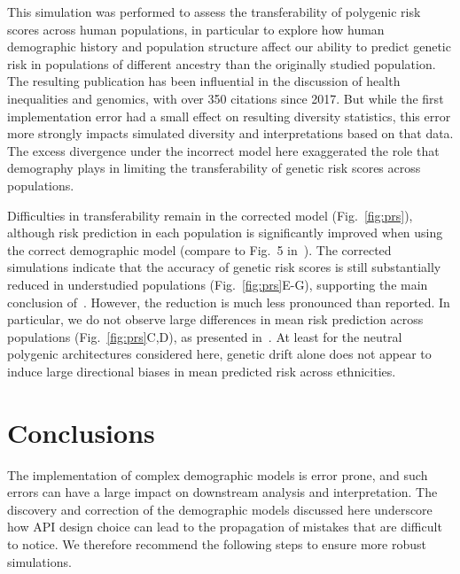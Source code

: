 \documentclass{article}
\begin{document}
This simulation was performed to assess the
transferability of polygenic risk scores across human populations, in particular to
explore how human demographic history and population structure affect our ability
to predict genetic risk in populations of different ancestry than the originally studied
population.
The resulting publication has been influential in the discussion of
health inequalities and genomics, with over 350 citations since 2017.
But while the first implementation error had a small effect on resulting diversity statistics,
this error more strongly impacts simulated diversity and interpretations based on that data.
The excess divergence under the incorrect model here exaggerated the role that demography
plays in limiting the transferability of genetic risk scores across populations.

Difficulties in transferability remain in the corrected model (Fig.~\ref{fig:prs}), although
risk prediction in each population is significantly improved when using the correct
demographic model (compare to Fig.~5 in~\citet{martin2017human}).
The corrected simulations indicate that the accuracy of genetic risk scores is still
substantially reduced in understudied populations (Fig.~\ref{fig:prs}E-G),
supporting the main conclusion of~\citet{martin2017human}.
However, the reduction is much less pronounced than reported.
In particular, we do not observe large differences in mean risk prediction
across populations (Fig.~\ref{fig:prs}C,D), as presented in~\citet{martin2017human}.
At least for the neutral polygenic architectures considered here, genetic drift alone
does not appear to induce large directional biases in mean predicted risk across ethnicities.

\section{Conclusions}

The implementation of complex demographic models is error prone, and such errors
can have a large impact on downstream analysis and interpretation. 
The discovery and correction of the demographic models discussed here underscore
how API design choice can lead to the propagation of mistakes that are difficult
to notice. We therefore recommend the following steps to ensure more robust simulations.
\end{document}

